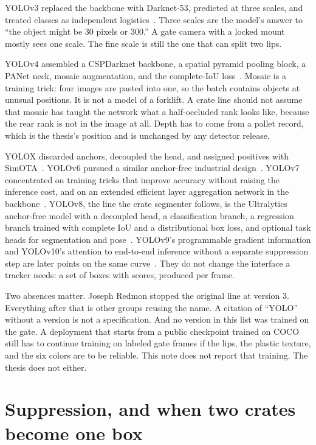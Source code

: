 \documentclass[11pt,a4paper]{article}
\begin{document}
YOLOv3 replaced the backbone with Darknet-53, predicted at three scales, and treated classes as independent logistics~\cite{redmon2018yolov3}. Three scales are the model's answer to ``the object might be 30 pixels or 300.'' A gate camera with a locked mount mostly sees one scale. The fine scale is still the one that can split two lips.

YOLOv4 assembled a CSPDarknet backbone, a spatial pyramid pooling block, a PANet neck, mosaic augmentation, and the complete-IoU loss~\cite{bochkovskiy2020yolov4,zheng2020diou}. Mosaic is a training trick: four images are pasted into one, so the batch contains objects at unusual positions. It is not a model of a forklift. A crate line should not assume that mosaic has taught the network what a half-occluded rank looks like, because the rear rank is not in the image at all. Depth has to come from a pallet record, which is the thesis's position and is unchanged by any detector release.

YOLOX discarded anchors, decoupled the head, and assigned positives with SimOTA~\cite{ge2021yolox}. YOLOv6 pursued a similar anchor-free industrial design~\cite{li2022yolov6}. YOLOv7 concentrated on training tricks that improve accuracy without raising the inference cost, and on an extended efficient layer aggregation network in the backbone~\cite{wang2023yolov7}. YOLOv8, the line the crate segmenter follows, is the Ultralytics anchor-free model with a decoupled head, a classification branch, a regression branch trained with complete IoU and a distributional box loss, and optional task heads for segmentation and pose~\cite{jocher2023yolov8}. YOLOv9's programmable gradient information and YOLOv10's attention to end-to-end inference without a separate suppression step are later points on the same curve~\cite{wang2024yolov9,wang2024yolov10}. They do not change the interface a tracker needs: a set of boxes with scores, produced per frame.

Two absences matter. Joseph Redmon stopped the original line at version 3. Everything after that is other groups reusing the name. A citation of ``YOLO'' without a version is not a specification. And no version in this list was trained on the gate. A deployment that starts from a public checkpoint trained on COCO~\cite{lin2014coco} still has to continue training on labeled gate frames if the lips, the plastic texture, and the six colors are to be reliable. This note does not report that training. The thesis does not either.

\section{Suppression, and when two crates become one box}
\label{sec:nms}
\end{document}
